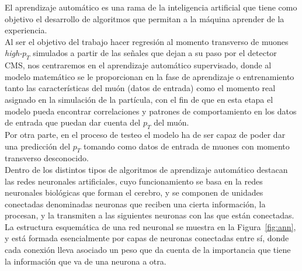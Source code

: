 El aprendizaje autom\'atico es una rama de la inteligencia artificial que tiene como objetivo el desarrollo de algoritmos que permitan a la m\'aquina aprender de la experiencia. \\

Al ser el objetivo del trabajo hacer regresi\'on al momento transverso de muones \textit{high-$p_{T}$} simulados a partir de las se\~nales que dejan a su paso por el detector CMS, nos centraremos en el aprendizaje autom\'atico supervisado, donde al modelo matem\'atico se le proporcionan en la fase de aprendizaje o entrenamiento tanto las caracter\'isticas del mu\'on (datos de entrada) como el momento real asignado en la simulaci\'on de la part\'icula, con el fin de que en esta etapa el modelo pueda encontrar correlaciones y patrones de comportamiento en los datos de entrada que puedan dar cuenta del $p_{T}$ del mu\'on. \\
Por otra parte, en el proceso de testeo el modelo ha de ser capaz de poder dar una predicci\'on del $p_{T}$ tomando como datos de entrada de muones con momento transverso desconocido. \\

Dentro de los distintos tipos de algoritmos de aprendizaje autom\'atico destacan las redes neuronales artificiales, cuyo funcionamiento se basa en la redes neuronales biol\'ogicas que forman el cerebro, y se componen de unidades conectadas denominadas neuronas que reciben una cierta informaci\'on, la procesan, y la transmiten a las siguientes neuronas con las que est\'an conectadas. La estructura esquem\'atica de una red neuronal se muestra en la Figura~\ref{fig:ann}, y est\'a formada esencialmente por capas de neuronas conectadas entre s\'i, donde cada conexi\'on lleva asociado un peso que da cuenta de la importancia que tiene la informaci\'on que va de una neurona a otra. \\

